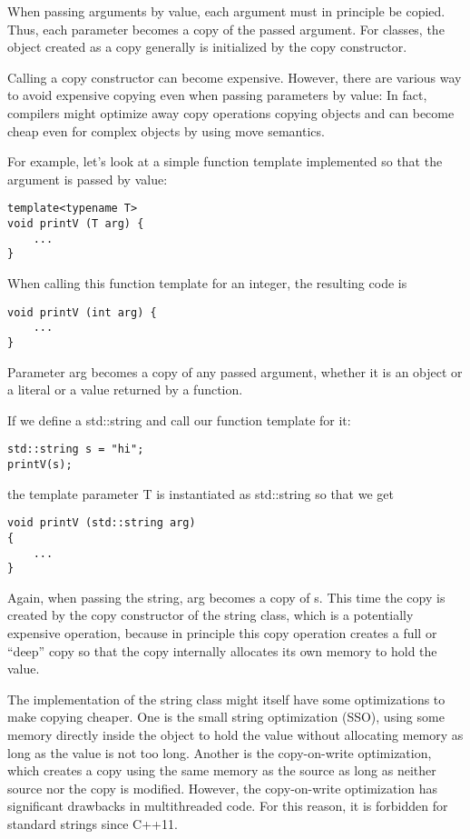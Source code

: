 When passing arguments by value, each argument must in principle be copied. Thus, each parameter becomes a copy of the passed argument. For classes, the object created as a copy generally is initialized by the copy constructor.

Calling a copy constructor can become expensive. However, there are various way to avoid expensive copying even when passing parameters by value: In fact, compilers might optimize away copy operations copying objects and can become cheap even for complex objects by using move semantics.

For example, let’s look at a simple function template implemented so that the argument is passed by value:

\begin{lstlisting}[style=styleCXX]
template<typename T>
void printV (T arg) {
	...
}
\end{lstlisting}

When calling this function template for an integer, the resulting code is

\begin{lstlisting}[style=styleCXX]
void printV (int arg) {
	...
}
\end{lstlisting}

Parameter arg becomes a copy of any passed argument, whether it is an object or a literal or a value returned by a function.

If we define a std::string and call our function template for it:

\begin{lstlisting}[style=styleCXX]
std::string s = "hi";
printV(s);
\end{lstlisting}

the template parameter T is instantiated as std::string so that we get

\begin{lstlisting}[style=styleCXX]
void printV (std::string arg)
{
	...
}
\end{lstlisting}

Again, when passing the string, arg becomes a copy of s. This time the copy is created by the copy constructor of the string class, which is a potentially expensive operation, because in principle this copy operation creates a full or “deep” copy so that the copy internally allocates its own memory to hold the value.

\begin{tcolorbox}[colback=webgreen!5!white,colframe=webgreen!75!black]
\hspace*{0.75cm}The implementation of the string class might itself have some optimizations to make copying cheaper. One is the small string optimization (SSO), using some memory directly inside the object to hold the value without allocating memory as long as the value is not too long. Another is the copy-on-write optimization, which creates a copy using the same memory as the source as long as neither source nor the copy is modified. However, the copy-on-write optimization has significant drawbacks in multithreaded code. For this reason, it is forbidden for standard strings since C++11.
\end{tcolorbox}

